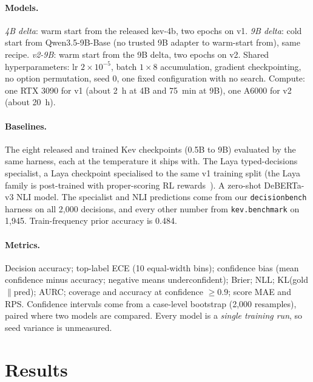 \documentclass{article}
\begin{document}
\paragraph{Models.} \emph{4B delta}: warm start from the released
kev-4b, two epochs on v1. \emph{9B delta}: cold start from
Qwen3.5-9B-Base (no trusted 9B adapter to warm-start from), same recipe.
\emph{v2-9B}: warm start from the 9B delta, two epochs on v2. Shared
hyperparameters: lr $2\times10^{-5}$, batch $1\times8$ accumulation,
gradient checkpointing, no option permutation, seed 0, one fixed
configuration with no search. Compute: one RTX 3090 for v1 (about 2~h at 4B
and 75~min at 9B), one A6000 for v2 (about 20~h).

\paragraph{Baselines.} The eight released and trained Kev checkpoints
(0.5B to 9B) evaluated by the same harness, each at the temperature it
ships with. The Laya typed-decisions specialist, a Laya checkpoint specialised to the
same v1 training split (the Laya family is post-trained with
proper-scoring RL rewards~\cite{laya2026}). A zero-shot DeBERTa-v3 NLI
model. The specialist and NLI predictions come from our
\texttt{decisionbench} harness on all 2,000 decisions, and every other
number from \texttt{kev.benchmark} on 1,945. Train-frequency prior
accuracy is 0.484.

\paragraph{Metrics.} Decision accuracy; top-label ECE (10 equal-width
bins); confidence bias (mean confidence minus accuracy; negative means
underconfident); Brier; NLL; KL(gold$\|$pred); AURC; coverage and accuracy
at confidence $\ge0.9$; score MAE and RPS. Confidence intervals come from a
case-level bootstrap (2,000 resamples), paired where two models are
compared. Every model is a \emph{single training run}, so seed variance is
unmeasured.

\section{Results}
\label{sec:results}
\end{document}
